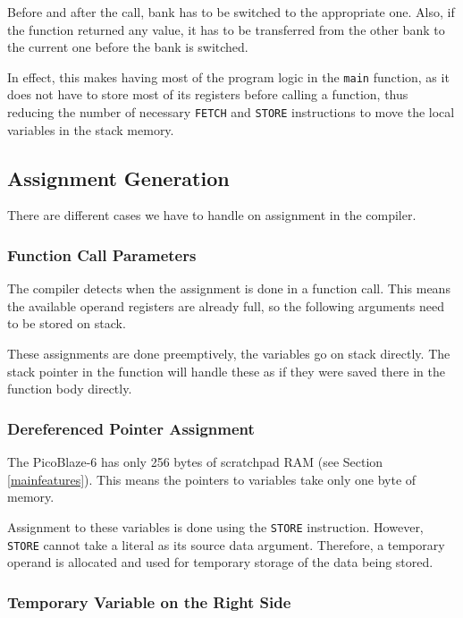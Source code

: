         Before and after the call, bank has to be switched to the appropriate one. Also, if the function returned any value, it has to be transferred from the other bank to the current one before the bank is switched.

        In effect, this makes having most of the program logic in the \texttt{main} function, as it does not have to store most of its registers before calling a function, thus reducing the number of necessary \texttt{FETCH} and \texttt{STORE} instructions to move the local variables in the stack memory.

        \subsection{Assignment Generation}

        There are different cases we have to handle on assignment in the compiler.

            \subsubsection{Function Call Parameters}

            The compiler detects when the assignment is done in a function call. This means the available operand registers are already full, so the following arguments need to be stored on stack.

            These assignments are done preemptively, the variables go on stack directly. The stack pointer in the function will handle these as if they were saved there in the function body directly.

            \subsubsection{Dereferenced Pointer Assignment}

            The PicoBlaze-6 has only 256 bytes of scratchpad RAM (see Section \ref{mainfeatures}). This means the pointers to variables take only one byte of memory.

            Assignment to these variables is done using the \texttt{STORE} instruction. However, \texttt{STORE} cannot take a literal as its source data argument. Therefore, a temporary operand is allocated and used for temporary storage of the data being stored.

            \subsubsection{Temporary Variable on the Right Side}

